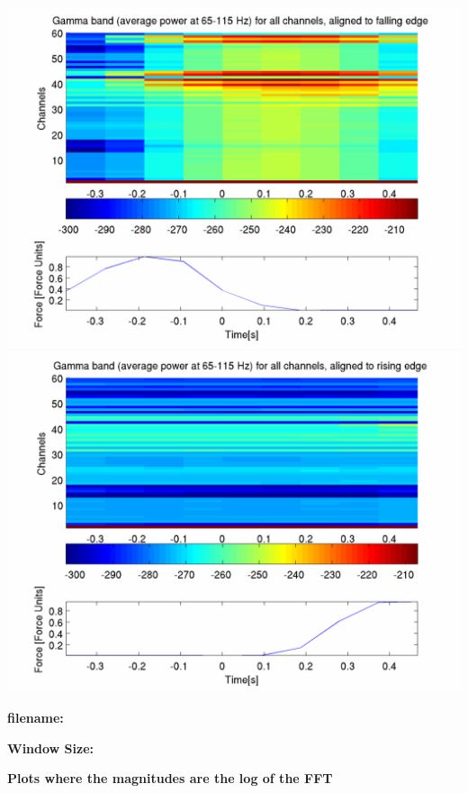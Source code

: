 \documentclass[12pt]{article}
\begin{document}
\includegraphics[scale=0.2]{gamma_falling_log.png}
\includegraphics[scale=0.2]{gamma_rising_log.png}

\newpage

\begin{center}
\textbf{filename: \expandafter\detokenize\expandafter{\myvar}}

\textbf{Window Size: \expandafter\detokenize\expandafter{\window}}

\textbf{Plots where the magnitudes are the log of the FFT}
\end{center}
\end{document}
